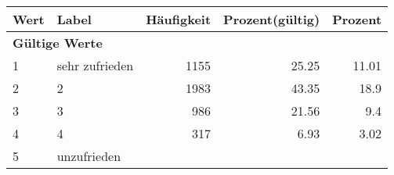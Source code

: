      \begin{longtable}{lXrrr}
     \toprule
     \textbf{Wert} & \textbf{Label} & \textbf{Häufigkeit} & \textbf{Prozent(gültig)} & \textbf{Prozent} \\
     \endhead
     \midrule
     \multicolumn{5}{l}{\textbf{Gültige Werte}}\\

     1 &
     \multicolumn{1}{X}{ sehr zufrieden   } &


       \num{1155} &
       \num[round-mode=places,round-precision=2]{25,25} &
         \num[round-mode=places,round-precision=2]{11,01} \\

     2 &
     \multicolumn{1}{X}{ 2   } &


       \num{1983} &
       \num[round-mode=places,round-precision=2]{43,35} &
         \num[round-mode=places,round-precision=2]{18,9} \\

     3 &
     \multicolumn{1}{X}{ 3   } &


       \num{986} &
       \num[round-mode=places,round-precision=2]{21,56} &
         \num[round-mode=places,round-precision=2]{9,4} \\

     4 &
     \multicolumn{1}{X}{ 4   } &


       \num{317} &
       \num[round-mode=places,round-precision=2]{6,93} &
         \num[round-mode=places,round-precision=2]{3,02} \\

     5 &
     \multicolumn{1}{X}{ unzufrieden   } &



\end{longtable}
